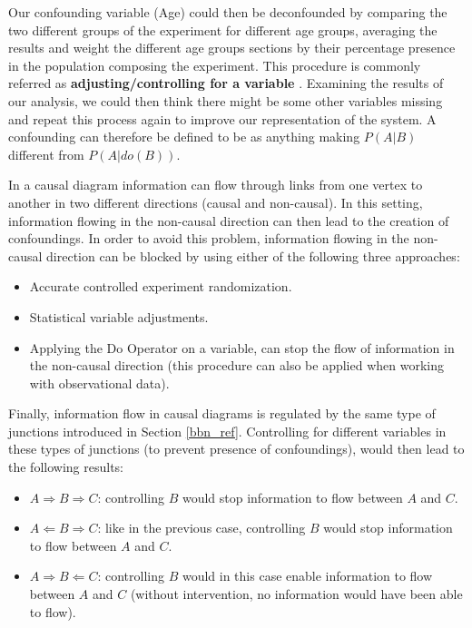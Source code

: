 Our confounding variable (Age) could then be deconfounded by comparing the two different groups of the experiment for different age groups, averaging the results and weight the different age groups sections by their percentage presence in the population composing the experiment. This procedure is commonly referred as \textbf{adjusting/controlling for a variable} \cite{why}. Examining the results of our analysis, we could then think there might be some other variables missing and repeat this process again to improve our representation of the system. A confounding can therefore be defined to be as anything making $P(A|B)$ different from $P(A|do(B))$.   

In a causal diagram information can flow through links from one vertex to another in two different directions (causal and non-causal). In this setting, information flowing in the non-causal direction can then lead to the creation of confoundings. In order to avoid this problem, information flowing in the non-causal direction can be blocked by using either of the following three approaches:

\begin{itemize}
    \item Accurate controlled experiment randomization.
    \item Statistical variable adjustments.
    \item Applying the Do Operator on a variable, can stop the flow of information in the non-causal direction (this procedure can also be applied when working with observational data).
\end{itemize}

Finally, information flow in causal diagrams is regulated by the same type of junctions introduced in Section \ref{bbn_ref}. Controlling for different variables in these types of junctions (to prevent presence of confoundings), would then lead to the following results:

\begin{itemize}
    \item \textbf{$A \Rightarrow B \Rightarrow C$}: controlling $B$ would stop information to flow between $A$ and $C$.
    \item \textbf{$A \Leftarrow B \Rightarrow C$}: like in the previous case, controlling $B$ would stop information to flow between $A$ and $C$.
    \item \textbf{$A \Rightarrow B \Leftarrow C$}: controlling $B$ would in this case enable information to flow between $A$ and $C$ (without intervention, no information would have been able to flow).
\end{itemize}

